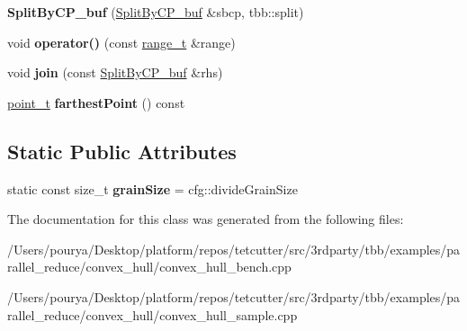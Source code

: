 \begin{DoxyCompactItemize}
\item 
\hypertarget{classSplitByCP__buf_a64ff270585ac42b4fb2b150b25489935}{}{\bfseries Split\+By\+C\+P\+\_\+buf} (\hyperlink{classSplitByCP__buf}{Split\+By\+C\+P\+\_\+buf} \&sbcp, tbb\+::split)\label{classSplitByCP__buf_a64ff270585ac42b4fb2b150b25489935}

\item 
\hypertarget{classSplitByCP__buf_a1c5aa41c1d75ad11aa1afb03fe011a43}{}void {\bfseries operator()} (const \hyperlink{classtbb_1_1blocked__range}{range\+\_\+t} \&range)\label{classSplitByCP__buf_a1c5aa41c1d75ad11aa1afb03fe011a43}

\item 
\hypertarget{classSplitByCP__buf_aa26b2bf50451fd4b09009c1ba481e379}{}void {\bfseries join} (const \hyperlink{classSplitByCP__buf}{Split\+By\+C\+P\+\_\+buf} \&rhs)\label{classSplitByCP__buf_aa26b2bf50451fd4b09009c1ba481e379}

\item 
\hypertarget{classSplitByCP__buf_a9c5c058b2f3f63c5a175fdc55fb084a0}{}\hyperlink{structutil_1_1point}{point\+\_\+t} {\bfseries farthest\+Point} () const \label{classSplitByCP__buf_a9c5c058b2f3f63c5a175fdc55fb084a0}

\end{DoxyCompactItemize}
\subsection*{Static Public Attributes}
\begin{DoxyCompactItemize}
\item 
\hypertarget{classSplitByCP__buf_a46490d44bcf4a1f998f904db2eca0c0c}{}static const size\+\_\+t {\bfseries grain\+Size} = cfg\+::divide\+Grain\+Size\label{classSplitByCP__buf_a46490d44bcf4a1f998f904db2eca0c0c}

\end{DoxyCompactItemize}


The documentation for this class was generated from the following files\+:\begin{DoxyCompactItemize}
\item 
/\+Users/pourya/\+Desktop/platform/repos/tetcutter/src/3rdparty/tbb/examples/parallel\+\_\+reduce/convex\+\_\+hull/convex\+\_\+hull\+\_\+bench.\+cpp\item 
/\+Users/pourya/\+Desktop/platform/repos/tetcutter/src/3rdparty/tbb/examples/parallel\+\_\+reduce/convex\+\_\+hull/convex\+\_\+hull\+\_\+sample.\+cpp\end{DoxyCompactItemize}
